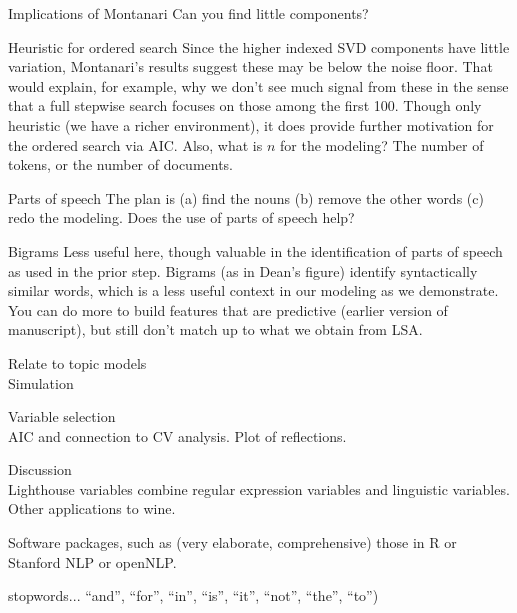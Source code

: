 \documentclass[12pt]{article}
\begin{document}
\begin{description}



\item{Implications of Montanari}  Can you find little components?  

\item{Heuristic for ordered search} Since the higher indexed SVD components have little variation, Montanari's results suggest these may be below the noise floor.  That would explain, for example, why we don't see much signal from these in the sense that a full stepwise search focuses on those among the first 100. Though only heuristic (we have a richer environment), it does provide further motivation for the ordered search via AIC.  Also, what is $n$ for the modeling?  The number of tokens, or the number of documents.

\item{Parts of speech}  The plan is (a) find the nouns (b) remove the other words (c) redo the modeling.  Does the use of parts of speech help?

\item{Bigrams} Less useful here, though valuable in the identification of parts of speech as used in the prior step.  Bigrams (as in Dean's figure) identify syntactically similar words, which is a less useful context in our modeling as we demonstrate.  You can do more to build features that are predictive (earlier version of manuscript), but still don't match up to what we obtain from LSA.


\item{Relate to topic models} \\ 
 Simulation

\item{Variable selection}  \\
 AIC and connection to CV analysis.  Plot of reflections.

\item{Discussion}  \\
Lighthouse variables combine regular expression variables and linguistic variables. Other applications to wine.

\end{description}

 
 Software packages, such as (very elaborate, comprehensive) those in R
 \citep[tm][]{feinerer08} or Stanford NLP or openNLP.

 stopwords... ``and'', ``for'', ``in'', ``is'', ``it'', ``not'', ``the'', ``to'')
 
\end{document}
